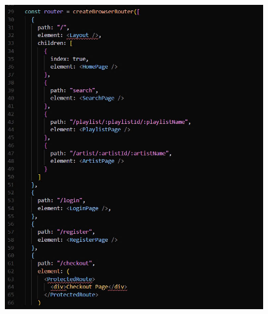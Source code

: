 \documentclass[a4paper]{article}
\begin{document}
\begin{figure}[H]
  \centering
  \begin{minipage}[b]{0.52\textwidth}
    \centering
    \includegraphics[width=\textwidth]{img/router1.jpg}
  \end{minipage}
  \hfill
  \begin{minipage}[b]{0.45\textwidth}
    \centering

\end{minipage}
\end{figure}
\end{document}
